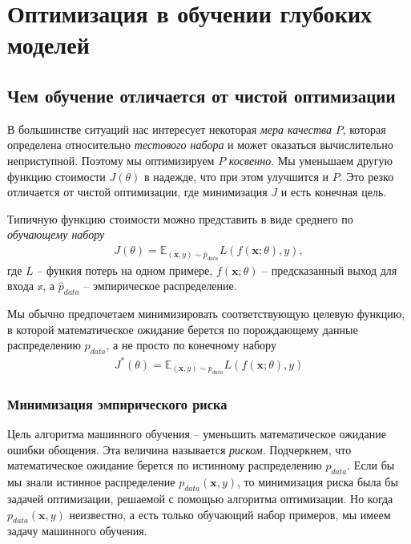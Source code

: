 \documentclass[%
	11pt,
	a4paper,
	utf8,
]{article}
\begin{document}
\section{Оптимизация в обучении глубоких моделей}

\subsection{Чем обучение отличается от чистой оптимизации}

В большинстве ситуаций нас интересует некоторая \emph{мера качества} $ P $, которая определена относительно \emph{тестового набора} и может оказаться вычислительно неприступной. Поэтому мы оптимизируем $ P $ \emph{косвенно}. Мы уменьшаем другую функцию стоимости $ J(\theta) $ в надежде, что при этом улучшится и $ P $. Это резко отличается от чистой оптимизации, где минимизация $ J $ и есть конечная цель.

Типичную функцию стоимости можно представить в виде среднего по \emph{обучающему набору}
\begin{align*}
	J(\theta) = \mathbb{E}_{ (\mathbf{x}, y) \sim \hat{p}_{data} } L(f(\mathbf{x}; \theta), y),
\end{align*}
где $ L $ -- функия потерь на одном примере, $ f(\mathbf{x}; \theta) $ -- предсказанный выход для входа $ \mathbb{x} $, а $ \hat{p}_{data} $ -- эмпирическое распределение.

Мы обычно предпочетаем минимизировать соответствующую целевую функцию, в которой математическое ожидание берется по порождающему данные распределению $ p_{data} $, а не просто по конечному набору
\begin{align*}
	J^*(\theta) = \mathbb{E}_{ (\mathbf{x}, y) \sim p_{data} } L(f(\mathbf{x}; \theta), y)
\end{align*}

\subsubsection{Минимизация эмпирического риска}

Цель алгоритма машинного обучения -- уменьшить математическое ожидание ошибки обощения. Эта величина называется \emph{риском}. Подчеркнем, что математическое ожидание берется по истинному распределению $ p_{data} $. Если бы мы знали истинное распределение $ p_{data}(\mathbf{x}, y) $, то минимизация риска была бы задачей оптимизации, решаемой с помощью алгоритма оптимизации. Но когда $ p_{data}(\mathbf{x}, y) $ неизвестно, а есть только обучающий набор примеров, мы имеем задачу машинного обучения.
\end{document}

